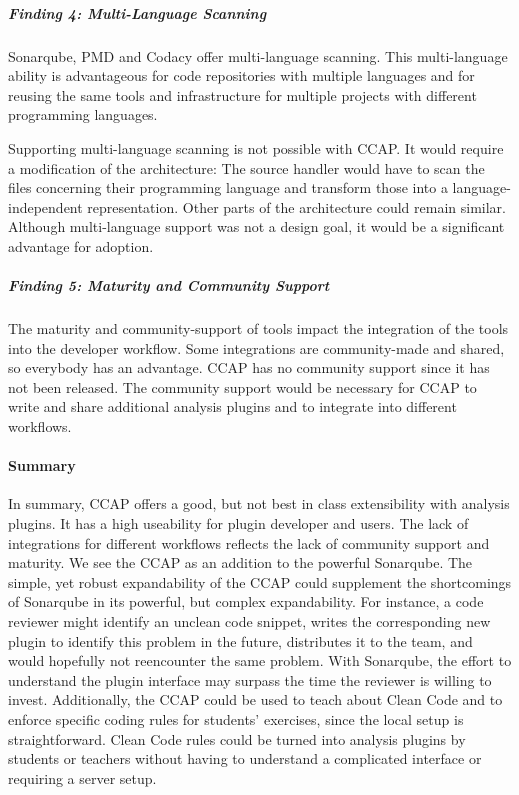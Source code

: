 \subparagraph{Finding 4: Multi-Language Scanning}
Sonarqube, PMD and Codacy offer multi-language scanning. This multi-language ability is advantageous for code repositories with multiple languages and for reusing the same tools and infrastructure for multiple projects with different programming languages. 

Supporting multi-language scanning is not possible with CCAP. It would require a modification of the architecture: The source handler would have to scan the files concerning their programming language and transform those into a language-independent representation. Other parts of the architecture could remain similar. Although multi-language support was not a design goal, it would be a significant advantage for adoption.

\subparagraph{Finding 5: Maturity and Community Support}
The maturity and community-support of tools impact the integration of the tools into the developer workflow. Some integrations are community-made and shared, so everybody has an advantage. 
CCAP has no community support since it has not been released. The community support would be necessary for CCAP to write and share additional analysis plugins and to integrate into different workflows. 

\paragraph{Summary}
In summary, CCAP offers a good, but not best in class extensibility with analysis plugins. It has a high useability for plugin developer and users. The lack of integrations for different workflows reflects the lack of community support and maturity. 
We see the CCAP as an addition to the powerful Sonarqube. The simple, yet robust expandability of the CCAP could supplement the shortcomings of Sonarqube in its powerful, but complex expandability. For instance, a code reviewer might identify an unclean code snippet, writes the corresponding new plugin to identify this problem in the future, distributes it to the team, and would hopefully not reencounter the same problem. With Sonarqube, the effort to understand the plugin interface may surpass the time the reviewer is willing to invest.
Additionally, the CCAP could be used to teach about Clean Code and to enforce specific coding rules for students' exercises, since the local setup is straightforward. Clean Code rules could be turned into analysis plugins by students or teachers without having to understand a complicated interface or requiring a server setup.

